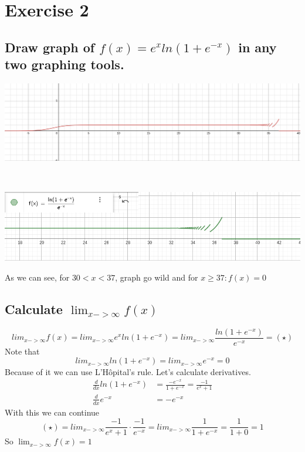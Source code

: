 \documentclass[11pt]{article}
\begin{document}
\section{Exercise 2}
\subsection{Draw graph of $f(x) = e^x ln(1+e^{-x})$ in any two graphing tools. }

\begin{minipage}{0.49\linewidth}
    \includegraphics[scale=0.25]{ex2/desmos}
\end{minipage}\\
\hfill
\begin{minipage}{0.49\linewidth}
    \includegraphics[scale=0.5]{ex2/geogebra}
\end{minipage}

As we can see, for $30 < x < 37$, graph go wild and for $x\geq 37: f(x) = 0$
\subsection{Calculate $\lim_{x->\infty} f(x)$}
$$lim_{x->\infty}f(x) = lim_{x->\infty} e^xln(1+e^{-x}) = lim_{x->\infty} \frac{ln(1+e^{-x})}{e^{-x}} = (\star)$$
Note that $$lim_{x->\infty} ln(1+e^{-x}) = lim_{x->\infty} e^{-x} = 0$$
Because of it we can use L'Hôpital's rule.  
Let's calculate derivatives.
\begin{align*} 
\frac{d}{dx}ln(1+e^{-x}) &= \frac{-e^{-x}}{1+e^{-x}} = \frac{-1}{e^x + 1} \\
\frac{d}{dx}e^{-x} &= -e^{-x}
\end{align*} 
With this we can continue
$$(\star) = lim_{x->\infty} \frac{-1}{e^x + 1} \cdot \frac{-1}{e^{-x}} = lim_{x->\infty} \frac{1}{1 + e^{-x}} = \frac{1}{1+0} = 1$$  
So $\lim_{x->\infty} f(x) = 1$
\end{document}
